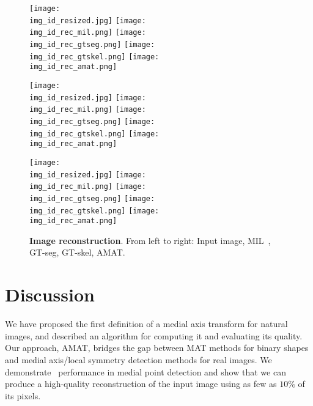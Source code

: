 \documentclass[10pt,twocolumn,letterpaper]{article}
\begin{document}
\begin{figure*}[t]
\centering
\def\imgw{0.195}

\def\img_id{145086}
\texttt{[image: \\img\_id\_resized.jpg]}
\texttt{[image: \\img\_id\_rec\_mil.png]}
\texttt{[image: \\img\_id\_rec\_gtseg.png]}
\texttt{[image: \\img\_id\_rec\_gtskel.png]}
\texttt{[image: \\img\_id\_rec\_amat.png]}

\def\img_id{85048}
\texttt{[image: \\img\_id\_resized.jpg]}
\texttt{[image: \\img\_id\_rec\_mil.png]}
\texttt{[image: \\img\_id\_rec\_gtseg.png]}
\texttt{[image: \\img\_id\_rec\_gtskel.png]}
\texttt{[image: \\img\_id\_rec\_amat.png]}

\def\img_id{42049}
\texttt{[image: \\img\_id\_resized.jpg]}
\texttt{[image: \\img\_id\_rec\_mil.png]}
\texttt{[image: \\img\_id\_rec\_gtseg.png]}
\texttt{[image: \\img\_id\_rec\_gtskel.png]}
\texttt{[image: \\img\_id\_rec\_amat.png]}

\caption{\textbf{Image reconstruction}. From left to right: Input image, MIL~\cite{tsogkas2012learning}, GT-seg, GT-skel, AMAT.}
\label{fig:experiments:reconstruction}
\end{figure*}



\section{Discussion}\label{sec:discussion}
We have proposed the first definition of a medial axis transform for natural images, and described an algorithm for
computing it and evaluating its quality.
Our approach, AMAT, bridges the gap between MAT methods for binary shapes and 
medial axis/local symmetry detection methods for real images.
We demonstrate \sota\ performance in medial point detection and show that we can produce a high-quality 
reconstruction of the input image using as few as $10\%$ of its pixels. 
\end{document}
